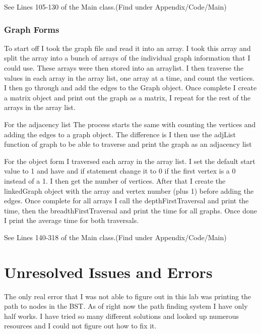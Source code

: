 \documentclass[10pt]{article}
\begin{document}
See Lines 105-130 of the Main class.(Find under Appendix/Code/Main)

\subsubsection{Graph Forms}
To start off I took the graph file and read it into an array. I took this array and split the array into a bunch of arrays of the individual graph information that I could use. These arrays were then stored into an arraylist. I then traverse the values in each array in the array list, one array at a time, and count the vertices. I then go through and add the edges to the Graph object. Once complete I create a matrix object and print out the graph as a matrix, I repeat for the rest of the arrays in the array list.

\newline

For the adjacency list The process starts the same with counting the vertices and adding the edges to a graph object. The difference is I then use the adjList function of graph to be able to traverse and print the graph as an adjacency list

\newline

For the object form I traversed each array in the array list. I set the default start value to 1 and have and if statement change it to 0 if the first vertex is a 0 instead of a 1. I then get the number of vertices. After that I create the linkedGraph object with the array and vertex number (plus 1) before adding the edges. Once complete for all arrays I call the depthFirstTraversal and print the time, then the breadthFirstTraversal and print the time for all graphs. Once done I print the average time for both traversals.

See Lines 140-318 of the Main class.(Find under Appendix/Code/Main)

\section{Unresolved Issues and Errors}
The only real error that I was not able to figure out in this lab was printing the path to nodes in the BST. As of right now the path finding system I have only half works. I have tried so many different solutions and looked up numerous resources and I could not figure out how to fix it.

\end{document}
